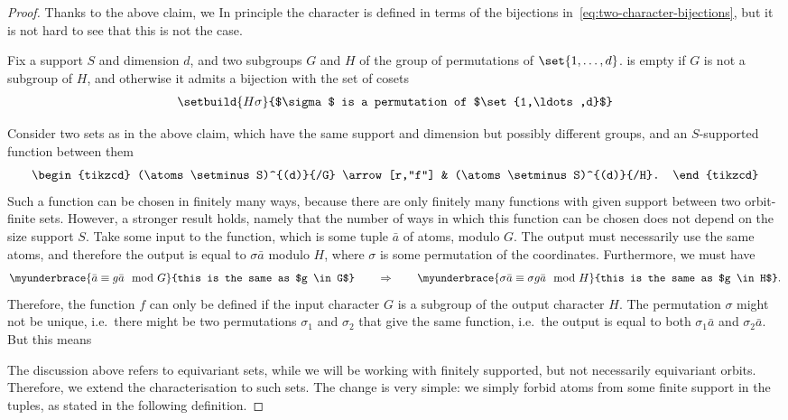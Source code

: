 \begin{proof}
    Thanks to the above claim, we 
    In principle the character is defined in terms of the bijections in~\eqref{eq:two-character-bijections}, but it is not hard to see that this is not the case. 
    \begin{claim}
        Fix a support $S$ and dimension $d$, and two subgroups $G$ and $H$ of the group of permutations of $\set{1,\ldots,d}$. 
        is empty if $G$ is not a subgroup of $H$, and otherwise it admits a bijection with the set of cosets 
        \begin{align*}
        \setbuild{ H\sigma  }{$\sigma$ is a permutation of $\set{1,\ldots,d}$}
        \end{align*}
    \end{claim}
    Consider two sets as in the above claim, which have the same support and dimension but possibly different groups, and  an $S$-supported function between them 
    \[
    \begin{tikzcd}
    (\atoms \setminus S)^{(d)}{/G} \arrow[r,"f"] & 
    (\atoms \setminus S)^{(d)}{/H}.
    \end{tikzcd}
    \]
    Such a function can be chosen in finitely many ways, because there are only finitely many functions with given support between two orbit-finite sets. However, a stronger result holds, namely that the number of ways in which this function can be chosen does not depend on the size support $S$. Take some input to the function, which is some tuple $\bar a$ of atoms, modulo $G$. The output  must necessarily use the same atoms, and therefore the output is equal to $\sigma \bar a$ modulo $H$, where $\sigma$ is some permutation of the coordinates. Furthermore, we must have 
    \begin{align*}
        \myunderbrace{\bar a  \equiv g \bar a \mod G}{this is the same as $g \in G$}  
        \qquad  \Rightarrow \qquad 
        \myunderbrace{\sigma \bar a \equiv \sigma g \bar  a \mod H}{this is the same as $g \in H$}.
    \end{align*}
    Therefore, the function $f$ can only be defined if the input character $G$ is a subgroup of the output character  $H$.  The permutation $\sigma$ might not be unique, i.e.~there might be two permutations $\sigma_1$ and $\sigma_2$ that give the same function, i.e.~the output is equal to both $\sigma_1 \bar a$ and $\sigma_2 \bar a$. But this means 

    The discussion above refers to equivariant sets, while we will be working with finitely supported, but not necessarily equivariant orbits. Therefore, we extend the characterisation to such sets. The change is very simple: we simply forbid atoms from some finite support in the tuples, as stated in the following definition.


\end{proof}

